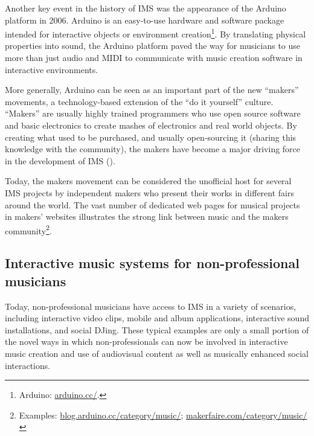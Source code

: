 \documentclass[a4paper,11pt]{article}
\begin{document}
Another key event in the history of IMS was the appearance of the Arduino platform in 2006.
Arduino is an easy-to-use hardware and software package intended for interactive objects or environment creation\footnote{Arduino: \href{http://arduino.cc/}{arduino.cc/}.}.
By translating physical properties into sound, the Arduino platform paved the way for musicians to use more than just audio and MIDI to communicate with music creation software in interactive environments.

More generally, Arduino can be seen as an important part of the new ``makers'' movements, a technology-based extension of the ``do it yourself'' culture.
``Makers'' are usually highly trained programmers who use open source software and basic electronics to create mashes of electronics and real world objects.
By creating what used to be purchased, and usually open-sourcing it (sharing this knowledge with the community), the makers have become a major driving force in the development of IMS (\cite{web:kirn12}).

Today, the makers movement can be considered the unofficial host for several IMS projects by independent makers who present their works in different fairs around the world.
The vast number of dedicated web pages for musical projects in makers' websites illustrates the strong link between music and the makers community\footnote{Examples: \href{http://blog.arduino.cc/category/music/}{blog.arduino.cc/category/music/}; \href{http://makerfaire.com/category/music/}{makerfaire.com/category/music/}}.

\subsection{Interactive music systems for non-professional musicians} \label{literature:non_pro_ims}

Today, non-professional musicians have access to IMS in a variety of scenarios, including interactive video clips, mobile and album applications, interactive sound installations, and social DJing.
These typical examples are only a small portion of the novel ways in which non-professionals can now be involved in interactive music creation and use of audiovisual content as well as musically enhanced social interactions.
\end{document}
